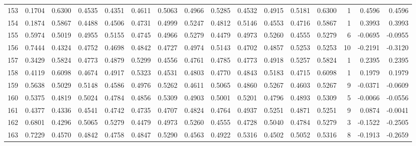 \begin{tabular}{lrrrrrrrrrrrrrrr}
153 &      0.1704 &  0.6300 &  0.4535 &  0.4351 &  0.4611 &  0.5063 &  0.4966 &  0.5285 &  0.4532 &  0.4915 &   0.5181 &     0.6300 &      1 &                    0.4596 &                     0.4596 \\
154 &      0.1874 &  0.5867 &  0.4488 &  0.4506 &  0.4731 &  0.4999 &  0.5247 &  0.4812 &  0.5146 &  0.4553 &   0.4716 &     0.5867 &      1 &                    0.3993 &                     0.3993 \\
155 &      0.5974 &  0.5019 &  0.4955 &  0.5155 &  0.4745 &  0.4966 &  0.5279 &  0.4479 &  0.4973 &  0.5260 &   0.4555 &     0.5279 &      6 &                   -0.0695 &                    -0.0955 \\
156 &      0.7444 &  0.4324 &  0.4752 &  0.4698 &  0.4842 &  0.4727 &  0.4974 &  0.5143 &  0.4702 &  0.4857 &   0.5253 &     0.5253 &     10 &                   -0.2191 &                    -0.3120 \\
157 &      0.3429 &  0.5824 &  0.4773 &  0.4879 &  0.5299 &  0.4556 &  0.4761 &  0.4785 &  0.4773 &  0.4918 &   0.5257 &     0.5824 &      1 &                    0.2395 &                     0.2395 \\
158 &      0.4119 &  0.6098 &  0.4674 &  0.4917 &  0.5323 &  0.4531 &  0.4803 &  0.4770 &  0.4843 &  0.5183 &   0.4715 &     0.6098 &      1 &                    0.1979 &                     0.1979 \\
159 &      0.5638 &  0.5029 &  0.5148 &  0.4586 &  0.4976 &  0.5262 &  0.4611 &  0.5065 &  0.4860 &  0.5267 &   0.4603 &     0.5267 &      9 &                   -0.0371 &                    -0.0609 \\
160 &      0.5375 &  0.4819 &  0.5024 &  0.4784 &  0.4856 &  0.5309 &  0.4903 &  0.5001 &  0.5201 &  0.4796 &   0.4893 &     0.5309 &      5 &                   -0.0066 &                    -0.0556 \\
161 &      0.4377 &  0.4336 &  0.4541 &  0.4742 &  0.4735 &  0.4707 &  0.4824 &  0.4764 &  0.4937 &  0.5251 &   0.4871 &     0.5251 &      9 &                    0.0874 &                    -0.0041 \\
162 &      0.6801 &  0.4296 &  0.5065 &  0.5279 &  0.4479 &  0.4973 &  0.5260 &  0.4555 &  0.4728 &  0.5040 &   0.4784 &     0.5279 &      3 &                   -0.1522 &                    -0.2505 \\
163 &      0.7229 &  0.4570 &  0.4842 &  0.4758 &  0.4847 &  0.5290 &  0.4563 &  0.4922 &  0.5316 &  0.4502 &   0.5052 &     0.5316 &      8 &                   -0.1913 &                    -0.2659 \\

\end{tabular}
